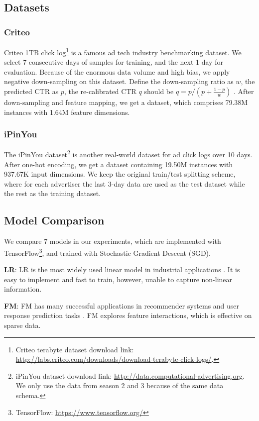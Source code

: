 \documentclass[conference]{IEEEtran}
\begin{document}
\subsection{Datasets}
\subsubsection{Criteo}
Criteo 1TB click log\footnote{Criteo terabyte dataset download link: \url{http://labs.criteo.com/downloads/download-terabyte-click-logs/}.} is a famous ad tech industry benchmarking dataset.
We select 7 consecutive days of samples for training, and the next 1 day for evaluation. Because of the enormous data volume and high bias, we apply negative down-sampling on this dataset.
Define the down-sampling ratio as $w$, the predicted CTR as $p$, the re-calibrated CTR $q$ should be $q =p / (p + \frac{1-p}{w})$ \cite{he2014practical}.
After down-sampling and feature mapping, we get a dataset, which comprises 79.38M instances with 1.64M feature dimensions.

\subsubsection{iPinYou}
The iPinYou dataset\footnote{iPinYou dataset download link: \url{http://data.computational-advertising.org}. We only use the data from season 2 and 3 because of the same data schema.} is another real-world dataset for ad click logs over 10 days.
After one-hot encoding, we get a dataset containing 19.50M instances with 937.67K input dimensions.
We keep the original train/test splitting scheme, where for each advertiser the last 3-day data are used as the test dataset while the rest as the training dataset.



\subsection{Model Comparison}
We compare 7 models in our experiments, which are implemented with TensorFlow\footnote{TensorFlow: \url{https://www.tensorflow.org/}}, and trained with Stochastic Gradient Descent (SGD).


\textbf{LR}: LR is the most widely used linear model in industrial applications \cite{mcmahan2013ad}. It is easy to implement and fast to train, however, unable to capture non-linear information.

\textbf{FM}: FM has many successful applications in recommender systems and user response prediction tasks \cite{rendle2010factorization}. FM explores feature interactions, which is effective on sparse data.
\end{document}
